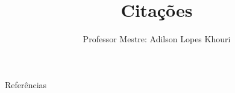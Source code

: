 \documentclass[compress, hyperref={pdfpagelayout=SinglePage}]{beamer}
\title[TCC II - Aula 04]{Citações}
\author{Professor Mestre: Adilson Lopes Khouri}
\begin{document}
	
	\begin{frame}
		\titlepage
	\end{frame}
	
	
	
	
	
	
	
	
		
	
	
	
		
	\begin{frame}[allowframebreaks]{}
		\begin{block}{Referências}
			\tiny
			\nocite{*}
			
	    		
	    	\end{block}
	\end{frame}
	
\end{document}
